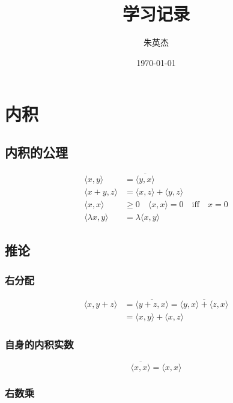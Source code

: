 \documentclass[12pt,a4paper]{ctexart}
\title{学习记录}
\author{朱英杰}
\date{\today}
\begin{document}
\maketitle
\tableofcontents

\section{内积}

\subsection{内积的公理}

\begin{align*}
    \langle x, y\rangle &= \overline{\langle y, x\rangle} \\
    \langle x+y , z \rangle &= \langle x, z\rangle + \langle y, z\rangle \\
    \langle x, x \rangle & \ge 0 \quad \langle x, x \rangle = 0\quad \text{iff} \quad x = 0 \\
    \langle \lambda x, y\rangle &= \lambda \langle x,y \rangle
\end{align*}

\subsection{推论}

\subsubsection{右分配}

\begin{align*}
    \langle x, y+z \rangle  &= \overline{\langle y+z, x \rangle} = \overline{\langle y,x \rangle + \langle z, x\rangle} \\
    &= \langle x,y \rangle + \langle x,z \rangle
\end{align*}

\subsubsection{自身的内积实数}

\[
\overline{ \langle x,x\rangle}= \langle x,x \rangle
\]

\subsubsection{右数乘}
\end{document}
